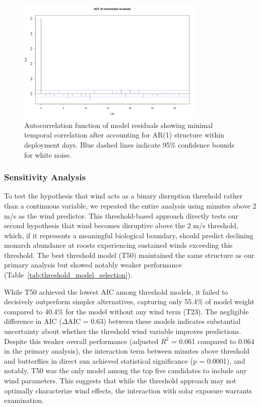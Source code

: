 \begin{figure}[htbp]
    \centering
    \includegraphics[width=0.8\textwidth]{supplemental/results/30_min/figures/diag_acf.png}
    \caption{Autocorrelation function of model residuals showing minimal temporal correlation after accounting for AR(1) structure within deployment days. Blue dashed lines indicate 95\% confidence bounds for white noise.}
    \label{fig:acf_diagnostics}
\end{figure} 

\subsubsection{Sensitivity Analysis}

To test the hypothesis that wind acts as a binary disruption threshold rather than a continuous variable, we repeated the entire analysis using minutes above 2 m/s as the wind predictor. This threshold-based approach directly tests our second hypothesis that wind becomes disruptive above the 2 m/s threshold, which, if it represents a meaningful biological boundary, should predict declining monarch abundance at roosts experiencing sustained winds exceeding this threshold. The best threshold model (T50) maintained the same structure as our primary analysis but showed notably weaker performance (Table~\ref{tab:threshold_model_selection}).

While T50 achieved the lowest AIC among threshold models, it failed to decisively outperform simpler alternatives, capturing only 55.4\% of model weight compared to 40.4\% for the model without any wind term (T23). The negligible difference in AIC ($\Delta$AIC = 0.63) between these models indicates substantial uncertainty about whether the threshold wind variable improves predictions. Despite this weaker overall performance (adjusted $R^2$ = 0.061 compared to 0.064 in the primary analysis), the interaction term between minutes above threshold and butterflies in direct sun achieved statistical significance (p = 0.0001), and notably, T50 was the only model among the top five candidates to include any wind parameters. This suggests that while the threshold approach may not optimally characterize wind effects, the interaction with solar exposure warrants examination.

